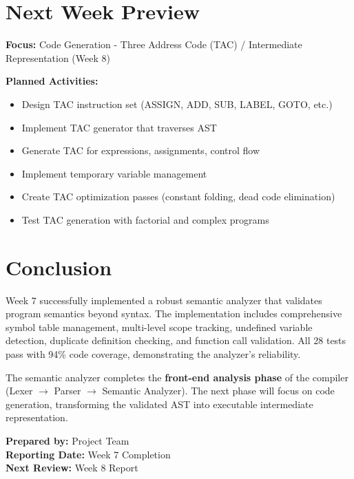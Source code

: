 \documentclass[a4paper,11pt]{article}
\begin{document}
    \section{Next Week Preview}

    \textbf{Focus:} Code Generation - Three Address Code (TAC) / Intermediate Representation (Week 8)

    \textbf{Planned Activities:}
    \begin{itemize}[leftmargin=*]
        \item Design TAC instruction set (ASSIGN, ADD, SUB, LABEL, GOTO, etc.)
        \item Implement TAC generator that traverses AST
        \item Generate TAC for expressions, assignments, control flow
        \item Implement temporary variable management
        \item Create TAC optimization passes (constant folding, dead code elimination)
        \item Test TAC generation with factorial and complex programs
    \end{itemize}

    \section{Conclusion}

    Week 7 successfully implemented a robust semantic analyzer that validates program semantics beyond syntax. The implementation includes comprehensive symbol table management, multi-level scope tracking, undefined variable detection, duplicate definition checking, and function call validation. All 28 tests pass with 94\% code coverage, demonstrating the analyzer's reliability.

    The semantic analyzer completes the \textbf{front-end analysis phase} of the compiler (Lexer $\rightarrow$ Parser $\rightarrow$ Semantic Analyzer). The next phase will focus on code generation, transforming the validated AST into executable intermediate representation.

    \vspace{5mm}
    \noindent\textbf{Prepared by:} Project Team \\
    \textbf{Reporting Date:} Week 7 Completion \\
    \textbf{Next Review:} Week 8 Report

    
\end{document}
